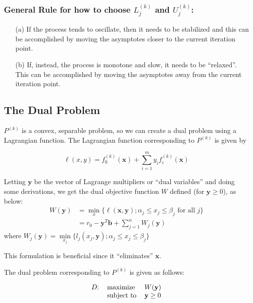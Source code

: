 \subsubsection*{General Rule for how to choose $L_j^{(k)}$ and $U_j^{(k)}$:}
\begin{itemize}
	\item[(a)] If the process tends to oscillate, then it needs to be stabilized and this can be accomplished by moving the asymptotes closer to the current iteration point.
	\item[(b)] If, instead, the process is monotone and slow, it needs to be ``relaxed''. This can be accomplished by moving the asymptotes away from the current iteration point.
\end{itemize}

\subsection{The Dual Problem}

$P^{(k)}$ is a convex, separable problem, so we can create a dual problem using a Lagrangian function. The Lagrangian function corresponding to $P^{(k)}$ is given by 

$$\ell(x,y)=f_0^{(k)}(\mathbf{x})+\sum\limits_{i=1}^{m}y_if_i^{(k)}(\mathbf{x})$$

Letting $\mathbf{y}$ be the vector of Lagrange multipliers or ``dual variables'' and doing some derivations, we get the dual objective function $W$ defined (for $\mathbf{y}\geq 0$), as below:
\begin{align*}
	W(\mathbf{y}) & =\min\limits_x\lbrace\ell(\mathbf{x},\mathbf{y}); \alpha_j\leq x_j\leq \beta_j\text{ for all }j\rbrace \\
	           & =r_0-\mathbf{y}^T\mathbf{b}+\sum\limits_{j=1}^{n}W_j(\mathbf{y})                                          
\end{align*}
where $W_j(\mathbf{y})=\min\limits_{x_j}\lbrace l_j(x_j,\mathbf{y}); \alpha_j\leq x_j\leq \beta_j\rbrace$

This formulation is beneficial since it ``eliminates'' $\mathbf{x}$.

The dual problem corresponding to $P^{(k)}$ is given as follows:

\begin{equation}
	\begin{tabular}{lll}
		$D$: & maximize   & $W(\mathbf{y})$    \\
		     & subject to & $\mathbf{y}\geq 0$
	\end{tabular}
\end{equation}
                                     
